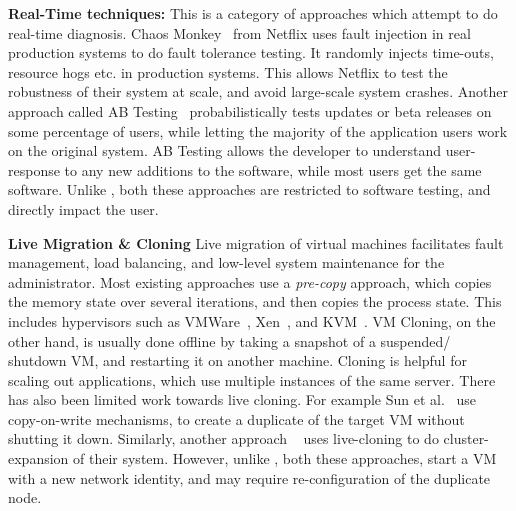 \textbf{Real-Time techniques:}
This is a category of approaches which attempt to do real-time diagnosis.
Chaos Monkey~\cite{chaosmonkey} from Netflix uses fault injection in real production systems to do fault tolerance testing.
It randomly injects time-outs, resource hogs etc. in production systems. 
This allows Netflix to test the robustness of their system at scale, and avoid large-scale system crashes.  
Another approach called AB Testing~\cite{abtesting} probabilistically tests updates or beta releases on some percentage of users, 
while letting the majority of the application users work on the original system.
AB Testing allows the developer to understand user-response to any new additions to the software, while most users get the same software.
Unlike \parikshan, both these approaches are restricted to software testing, and directly impact the user.


\textbf{Live Migration \& Cloning}
Live migration of virtual machines facilitates fault management, load balancing, and low-level system maintenance for the administrator.
Most existing approaches use a \textit{pre-copy} approach, which copies the memory state over several iterations, and then copies the process state.
This includes hypervisors such as VMWare~\cite{nelson2005fast}, Xen~\cite{clark2005live}, and KVM~\cite{kivity2007kvm}.
VM Cloning, on the other hand, is usually done offline by taking a snapshot of a suspended/ shutdown VM, and restarting it on another machine.
Cloning is helpful for scaling out applications, which use multiple instances of the same server.
There has also been limited work towards live cloning. 
For example Sun et al.~\cite{Sun:2009:FLC:1581383.1582148} use copy-on-write mechanisms, to create a duplicate of the target VM without shutting it down.
Similarly, another approach ~\cite{gebhart2009dynamic} uses live-cloning to do cluster-expansion of their system.
However, unlike \parikshan, both these approaches, start a VM with a new network identity, and may require re-configuration of the duplicate node.
  